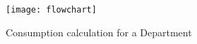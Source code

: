 \begin{figure}[htb]
    \centering
    \texttt{[image: flowchart]}
    \caption{Consumption calculation for a Department}
    \label{fig:consumption_flowchart}
\end{figure}